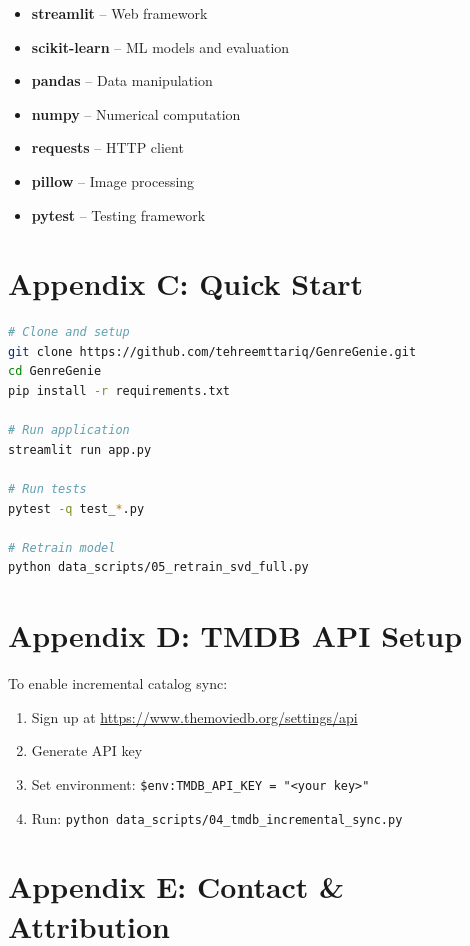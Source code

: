 \documentclass[11pt,a4paper]{article}
\begin{document}
\begin{itemize}
    \item \textbf{streamlit} – Web framework
    \item \textbf{scikit-learn} – ML models and evaluation
    \item \textbf{pandas} – Data manipulation
    \item \textbf{numpy} – Numerical computation
    \item \textbf{requests} – HTTP client
    \item \textbf{pillow} – Image processing
    \item \textbf{pytest} – Testing framework
\end{itemize}

\section*{Appendix C: Quick Start}

\begin{lstlisting}[language=bash]
# Clone and setup
git clone https://github.com/tehreemttariq/GenreGenie.git
cd GenreGenie
pip install -r requirements.txt

# Run application
streamlit run app.py

# Run tests
pytest -q test_*.py

# Retrain model
python data_scripts/05_retrain_svd_full.py
\end{lstlisting}

\section*{Appendix D: TMDB API Setup}

To enable incremental catalog sync:

\begin{enumerate}
    \item Sign up at \url{https://www.themoviedb.org/settings/api}
    \item Generate API key
    \item Set environment: \texttt{\$env:TMDB\_API\_KEY = "<your key>"}
    \item Run: \texttt{python data\_scripts/04\_tmdb\_incremental\_sync.py}
\end{enumerate}

\section*{Appendix E: Contact \& Attribution}
\end{document}

